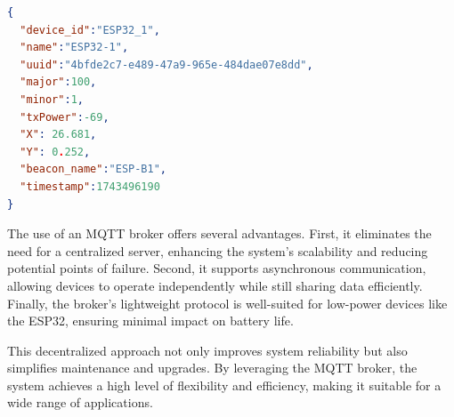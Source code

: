 \begin{lstlisting}[language=json, caption={Payload of the position data}, label={lst:payload}]
{
  "device_id":"ESP32_1",
  "name":"ESP32-1",
  "uuid":"4bfde2c7-e489-47a9-965e-484dae07e8dd",
  "major":100,
  "minor":1,
  "txPower":-69,
  "X": 26.681,
  "Y": 0.252,
  "beacon_name":"ESP-B1",
  "timestamp":1743496190
}
\end{lstlisting}

The use of an MQTT broker offers several advantages. First, it eliminates the need for a centralized server, enhancing the system’s scalability and reducing potential points of failure. Second, it supports asynchronous communication, allowing devices to operate independently while still sharing data efficiently. Finally, the broker’s lightweight protocol is well-suited for low-power devices like the ESP32, ensuring minimal impact on battery life.

This decentralized approach not only improves system reliability but also simplifies maintenance and upgrades. By leveraging the MQTT broker, the system achieves a high level of flexibility and efficiency, making it suitable for a wide range of applications.


